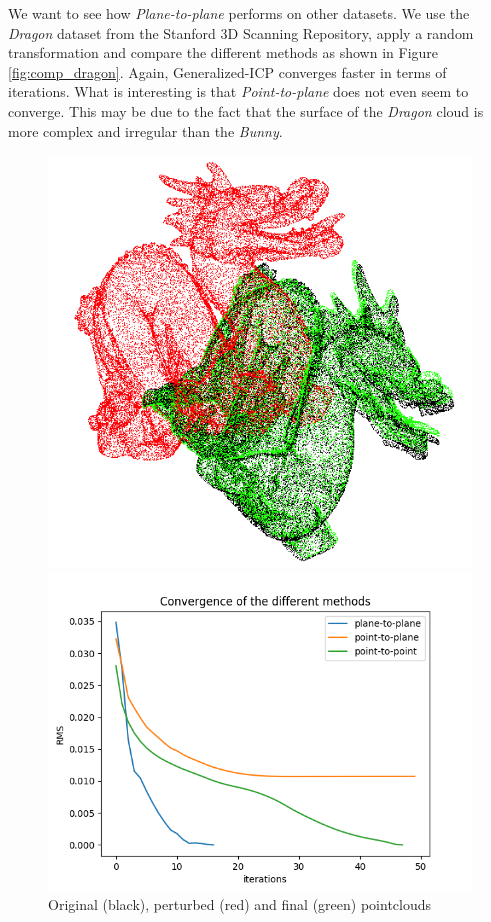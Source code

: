 \documentclass[11pt,letterpaper,leqno]{article}
\begin{document}
We want to see how \textit{Plane-to-plane} performs on other datasets. We use the \textit{Dragon} dataset from the Stanford 3D Scanning Repository, apply a random transformation and compare the different methods as shown in Figure \ref{fig:comp_dragon}. Again, Generalized-ICP converges faster in terms of iterations. What is interesting is that \textit{Point-to-plane} does not even seem to converge. This may be due to the fact that the surface of the \textit{Dragon} cloud is more complex and irregular than the \textit{Bunny}.

\begin{figure}[ht!]
    \centering
    \begin{minipage}{0.4\linewidth}
        \includegraphics[width=\linewidth]{img/conv_dragon.png}
        \caption{Original (black), perturbed (red) and final (green) pointclouds}
        \end{minipage}\hfill
    \begin{minipage}{0.5\linewidth}
    \includegraphics[width=\linewidth]{img/comparison_dragon.png}

\end{minipage}
\end{figure}
\end{document}
